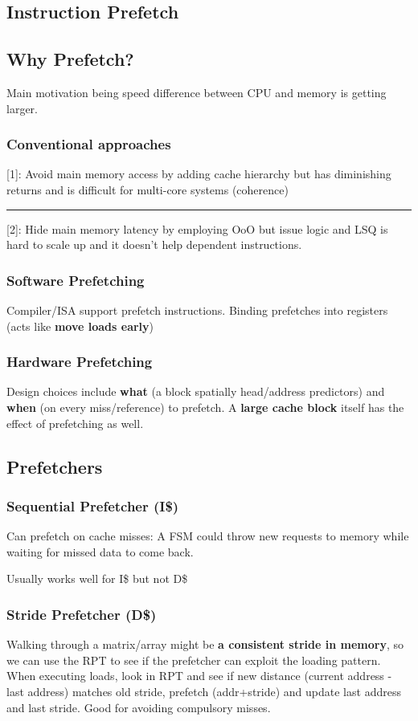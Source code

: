 \documentclass{article}
\begin{document}
\begin{multicols*}{2}
\section{Instruction Prefetch}
\subsection*{Why Prefetch?}
Main motivation being speed difference between CPU and memory is getting larger.
\subsubsection*{Conventional approaches}
{[1]}: Avoid main memory access by adding cache hierarchy but has diminishing returns and is difficult for multi-core systems (coherence)
\medskip\hrule\medskip\noindent
{[2]}: Hide main memory latency by employing OoO but issue logic and LSQ is hard to scale up and it doesn't help dependent instructions.

\subsubsection*{Software Prefetching}
Compiler/ISA support prefetch instructions. Binding prefetches into registers (acts like \textbf{move loads early})

\subsubsection*{Hardware Prefetching}
Design choices include \textbf{what} (a block spatially head/address predictors) and \textbf{when} (on every miss/reference) to prefetch. A \textbf{large cache block} itself has the effect of prefetching as well.

\subsection*{Prefetchers}
\subsubsection*{Sequential Prefetcher (I\$)}
Can prefetch on cache misses: A FSM could throw new requests to memory while waiting for missed data to come back.
\par\noindent
Usually works well for I\$ but not D\$

\subsubsection*{Stride Prefetcher (D\$)}
Walking through a matrix/array might be \textbf{a consistent stride in memory}, so we can use the RPT to see if the prefetcher can exploit the loading pattern. When executing loads, look in RPT and see if new distance (current address - last address) matches old stride, prefetch (addr+stride) and update last address and last stride. Good for avoiding compulsory misses.


\end{multicols*}
\end{document}
